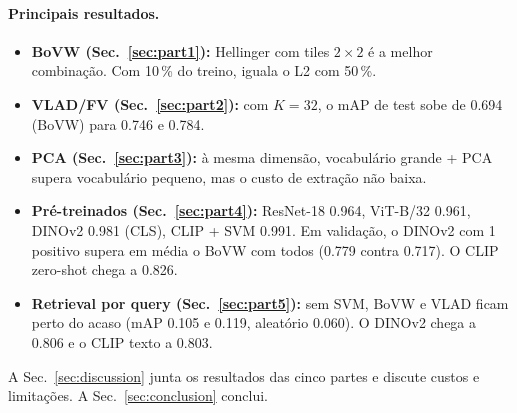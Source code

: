 \paragraph{Principais resultados.}
\begin{itemize}\setlength\itemsep{0pt}
    \item \textbf{BoVW (Sec.~\ref{sec:part1}):} Hellinger com tiles $2\times2$ é a melhor combinação. Com 10\,\% do treino, iguala o L2 com 50\,\%.
    \item \textbf{VLAD/FV (Sec.~\ref{sec:part2}):} com $K{=}32$, o mAP de test sobe de 0.694 (BoVW) para 0.746 e 0.784.
    \item \textbf{PCA (Sec.~\ref{sec:part3}):} à mesma dimensão, vocabulário grande + PCA supera vocabulário pequeno, mas o custo de extração não baixa.
    \item \textbf{Pré-treinados (Sec.~\ref{sec:part4}):} ResNet-18 0.964, ViT-B/32 0.961, DINOv2 0.981 (CLS), CLIP + SVM 0.991. Em validação, o DINOv2 com 1 positivo supera em média o BoVW com todos (0.779 contra 0.717). O CLIP zero-shot chega a 0.826.
    \item \textbf{Retrieval por query (Sec.~\ref{sec:part5}):} sem SVM, BoVW e VLAD ficam perto do acaso (mAP 0.105 e 0.119, aleatório 0.060). O DINOv2 chega a 0.806 e o CLIP texto a 0.803.
\end{itemize}
A Sec.~\ref{sec:discussion} junta os resultados das cinco partes e discute custos e limitações. A Sec.~\ref{sec:conclusion} conclui.
